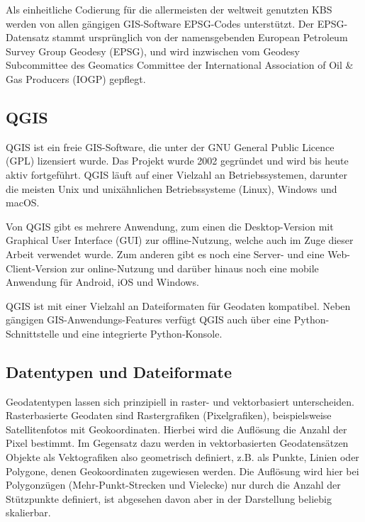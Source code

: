 			Als einheitliche Codierung für die allermeisten der weltweit genutzten KBS werden von allen gängigen GIS-Software EPSG-Codes unterstützt. Der EPSG-Datensatz stammt ursprünglich von der namensgebenden European Petroleum Survey Group Geodesy (EPSG), und wird inzwischen vom Geodesy Subcommittee des Geomatics Committee der International Association of Oil \& Gas Producers (IOGP) gepflegt. \cite{web_epsg}
			
		\subsection{QGIS}
			QGIS ist ein freie GIS-Software, die unter der GNU General Public Licence (GPL) lizensiert wurde. Das Projekt wurde 2002 gegründet und wird bis heute aktiv fortgeführt. QGIS läuft auf einer Vielzahl an Betriebssystemen, darunter die meisten Unix und unixähnlichen Betriebssysteme (Linux), Windows und macOS. \cite{web_qgis}\cite{web_qgis_docs}
			
			Von QGIS gibt es mehrere Anwendung, zum einen die Desktop-Version mit Graphical User Interface (GUI) zur offline-Nutzung, welche auch im Zuge dieser Arbeit verwendet wurde. Zum anderen gibt es noch eine Server- und eine Web-Client-Version zur online-Nutzung und darüber hinaus noch eine mobile Anwendung für Android, iOS und Windows. \cite{web_qgis}
			
			QGIS ist mit einer Vielzahl an Dateiformaten für Geodaten kompatibel. Neben gängigen GIS-Anwendungs-Features verfügt QGIS auch über eine Python-Schnittstelle und eine integrierte Python-Konsole. \cite{web_qgis_docs}
				
		\subsection{Datentypen und Dateiformate}
			Geodatentypen lassen sich prinzipiell in raster- und vektorbasiert unterscheiden. Rasterbasierte Geodaten sind Rastergrafiken (Pixelgrafiken), beispielsweise Satellitenfotos mit Geokoordinaten. Hierbei wird die Auflösung die Anzahl der Pixel bestimmt. Im Gegensatz dazu werden in vektorbasierten Geodatensätzen Objekte als Vektografiken also geometrisch definiert, z.B. als Punkte, Linien oder Polygone, denen Geokoordinaten zugewiesen werden. Die Auflösung wird hier bei Polygonzügen (Mehr-Punkt-Strecken und Vielecke) nur durch die Anzahl der Stützpunkte definiert, ist abgesehen davon aber in der Darstellung beliebig skalierbar.
			
